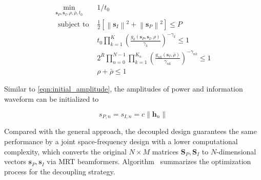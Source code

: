 \begin{eqnarray}
  {\mathop {\min }\limits_{{{\mathbf{s}}_P},{{\mathbf{s}}_I},\rho ,\bar \rho ,{t_0}} }&{1/{t_0}} \label{eqn:decoupled_target} \\
  {{\text{ subject to }}}&{\frac{1}{2}\left[ {\left\| {{{\mathbf{s}}_I}} \right\|^2 + \left\| {{{\mathbf{s}}_P}} \right\|^2} \right] \leqslant P} \label{eqn:decoupled_power_constraint} \\
  {}&{{t_0}\prod\limits_{k = 1}^K {{{\left( {\frac{{{g_k}\left( {{{\mathbf{s}}_P},{{\mathbf{s}}_I},\rho } \right)}}{{{\gamma _k}}}} \right)}^{ - {\gamma _k}}}}  \leqslant 1} \label{eqn:decoupled_current_constraint} \\
  {}&{2^{\bar R}}\prod\limits_{n = 0}^{N - 1} {\prod\limits_{k = 1}^{{K_n}} {{{\left( {\frac{{{g_{nk}}\left( {{{\mathbf{s}}_I},\bar \rho } \right)}}{{{\gamma _{nk}}}}} \right)}^{ - {\gamma _{nk}}}}} }  \leqslant 1 \label{eqn:decoupled_rate_constraint} \\
  {}&{\rho  + \bar \rho  \leqslant 1} \label{eqn:decoupled_ratio_constraint}
\end{eqnarray}

Similar to \ref{eqn:initial_amplitude}, the amplitudes of power and information waveform can be initialized to

\begin{equation}\label{eqn:initial_amplitude_decoupled}
  {s_{P,n}} = {s_{I,n}} = c\left\| {{{\mathbf{h}}_n}} \right\|
\end{equation}

Compared with the general approach, the decoupled design guarantees the same performance by a joint space-frequency design with a lower computational complexity, which converts the original $N \times M$ matrices ${{{\mathbf{S}}_P},{{\mathbf{S}}_I}}$ to $N$-dimensional vectors ${{{\mathbf{s}}_P},{{\mathbf{s}}_I}}$ via MRT beamformers. Algorithm \ summarizes the optimization process for the decoupling strategy.

